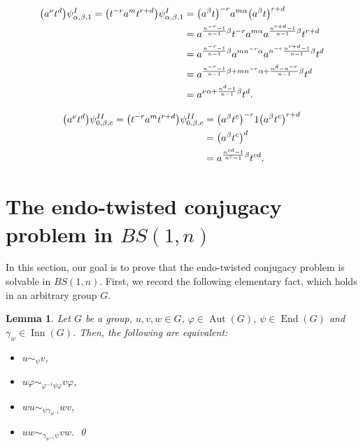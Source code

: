 \documentclass[a4paper]{amsart}
\newtheorem{lem}[thm]{Lemma}
\theoremstyle{definition}
\newcommand{\Aut}{\operatorname{Aut}}
\newcommand{\End}{\operatorname{End}}
\newcommand{\Inn}{\operatorname{Inn}}
\begin{document}
 \begin{align}\label{eq: action I}
\big( a^{\nu}t^d \big) \psi^I_{\alpha,\beta, 1} = \big( t^{-r}a^{m}t^{r+d}\big) \psi^I_{\alpha,\beta, 1} &= \big( a^{\beta}t\big)^{-r} a^{m\alpha} \big(a^{\beta}t\big)^{r+d} \notag \\ &= a^{\frac{n^{-r}-1}{n-1}\beta}t^{-r} a^{m\alpha} a^{\frac{n^{r+d}-1}{n-1}\beta}t^{r+d} \notag \\ &= a^{\frac{n^{-r}-1}{n-1}\beta} a^{m n^{-r}\alpha} a^{n^{-r}\frac{n^{r+d}-1}{n-1}\beta}t^{d} \\ &= a^{\frac{n^{-r}-1}{n-1}\beta+ m n^{-r}\alpha + \frac{n^{d}-n^{-r}}{n-1}\beta}t^{d} \notag \\ &= a^{\nu \alpha + \frac{n^{d}-1}{n-1}\beta}t^{d}. \notag
 \end{align}

  \begin{align}\label{eq: action II}
\big( a^{\nu}t^d \big) \psi^{II}_{0,\beta, c} = \big( t^{-r}a^{m}t^{r+d}\big) \psi^{II}_{0,\beta, c} &= \big( a^{\beta}t^c\big)^{-r} 1 \big( a^{\beta}t^c\big)^{r+d} \notag \\ &= \big( a^{\beta}t^c\big)^d \\ &= a^{\frac{n^{cd}-1}{n^c-1}\beta}t^{cd}. \notag
 \end{align}




\section{The endo-twisted conjugacy problem in $BS(1,n)$}\label{sec: TCP}

In this section, our goal is to prove that the endo-twisted conjugacy problem is solvable in $BS(1,n)$. First, we record the following elementary fact, which holds in an arbitrary group $G$. 

\begin{lem} \label{lem: twisted endos}
Let $G$ be a group, $u,v,w \in G$, $\varphi \in \Aut(G)$, $\psi \in \End(G)$ and $\gamma_w \in \Inn(G)$. Then, the following are equivalent:
 \begin{itemize}
\item[(a)] $u \sim_\psi v$,
\item[(b)] $u \varphi \sim_{\varphi^{-1}\psi\varphi} v \varphi$,
\item[(c)] $wu \sim_{\psi\gamma_{w^{-1}}} wv$, 
\item[(d)] $uw \sim_{\gamma_{w^{-1}}\psi} vw$. \hfill \qed
 \end{itemize}
\end{lem}
\end{document}
